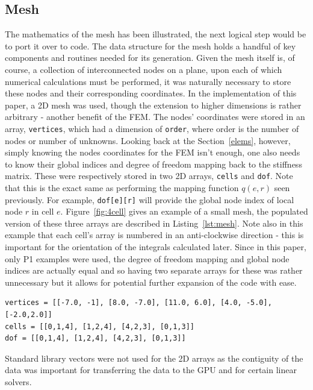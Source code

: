 \subsection{Mesh}\label{mesh}

The mathematics of the mesh has been illustrated, the next logical step would be to port it over to code. The data structure for the mesh holds a handful of key components and routines needed for its generation. Given the mesh itself is, of course, a collection of interconnected nodes on a plane, upon each of which numerical calculations must be performed, it was naturally necessary to store these nodes and their corresponding coordinates. In the implementation of this paper, a 2D mesh was used, though the extension to higher dimensions is rather arbitrary - another benefit of the FEM. The nodes' coordinates were stored in an array, \texttt{vertices}, which had a dimension of \texttt{order}, where order is the number of nodes or number of unknowns. Looking back at the Section~\ref{elems}, however, simply knowing the nodes coordinates for the FEM isn't enough, one also needs to know their global indices and degree of freedom mapping back to the stiffness matrix. These were respectively stored in two 2D arrays, \texttt{cells} and \texttt{dof}. Note that this is the exact same as performing the mapping function $q(e,r)$ seen previously. For example, \texttt{dof[e][r]} will provide the global node index of local node $r$ in cell $e$. Figure~\ref{fig:4cell} gives an example of a small mesh, the populated version of these three arrays are described in Listing~\ref{lst:mesh}. Note also in this example that each cell's array is numbered in an anti-clockwise direction - this is important for the orientation of the integrals calculated later. Since in this paper, only P1 examples were used, the degree of freedom mapping and global node indices are actually equal and so having two separate arrays for these was rather unnecessary but it allows for potential further expansion of the code with ease.

\begin{lstlisting}[basicstyle=\footnotesize, caption={Example of populated mesh.}, label={lst:mesh}]
vertices = [[-7.0, -1], [8.0, -7.0], [11.0, 6.0], [4.0, -5.0], [-2.0,2.0]]
cells = [[0,1,4], [1,2,4], [4,2,3], [0,1,3]]
dof = [[0,1,4], [1,2,4], [4,2,3], [0,1,3]]
\end{lstlisting}

\begin{remark}
	Standard library vectors were not used for the 2D arrays as the contiguity of the data was important for transferring the data to the GPU and for certain linear solvers.
\end{remark}

